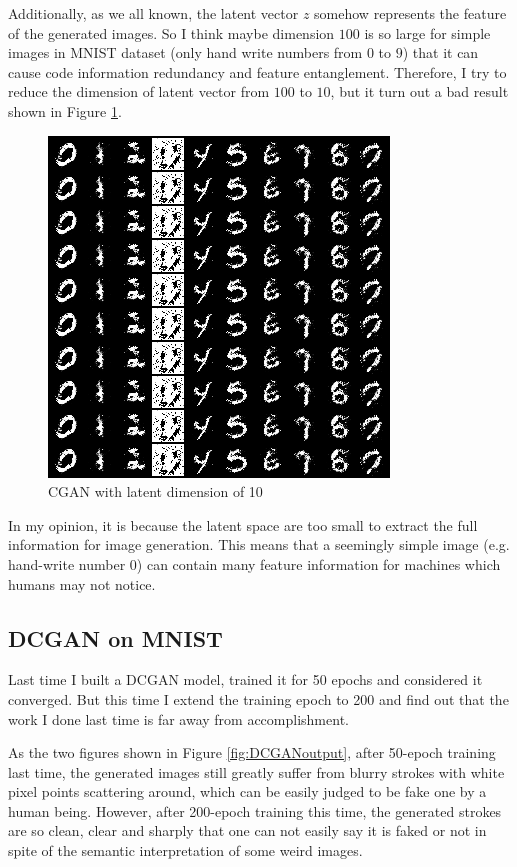 \documentclass{article} %
\begin{document}
Additionally, as we all known, the latent vector $z$ somehow represents the feature of the generated images. So I think maybe dimension $100$ is so large for simple images in MNIST dataset (only hand write numbers from $0$ to $9$) that it can cause code information redundancy and feature entanglement. Therefore, I try to reduce the dimension of latent vector from $100$ to $10$, but it turn out a bad result shown in Figure \ref{fig:CGAN_latent_dim_10}. 

\begin{figure}[h]
	\centering
	\includegraphics[width=0.4\linewidth]{figures/CGAN_latent_dim_10.png}
	\caption{CGAN with latent dimension of 10}
	\label{fig:CGAN_latent_dim_10}
\end{figure}

In my opinion, it is because the latent space are too small to extract the full information for image generation. This means that a seemingly simple image (e.g. hand-write number $0$) can contain many feature information for machines which humans may not notice.

\subsection{DCGAN on MNIST}

Last time I built a DCGAN model, trained it for 50 epochs and considered it converged. But this time I extend the training epoch to 200 and find out that the work I done last time is far away from accomplishment.

As the two figures shown in Figure \ref{fig:DCGANoutput}, after 50-epoch training last time, the generated images still greatly suffer from blurry strokes with white pixel points scattering around, which can be easily judged to be fake one by a human being. However, after 200-epoch training this time, the generated strokes are so clean, clear and sharply that one can not easily say it is faked or not in spite of the semantic interpretation of some weird images.
\end{document}
